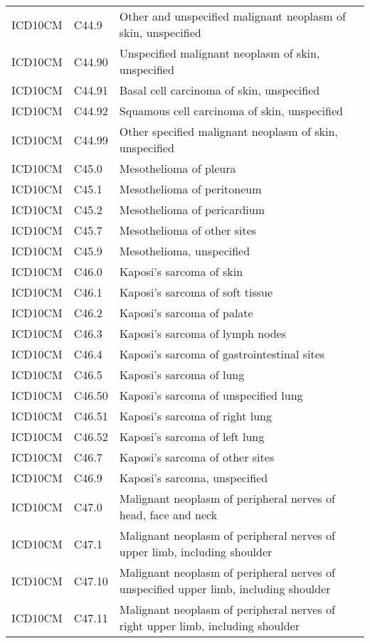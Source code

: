 \begin{longtable}{p{}p{}p{}}
  ICD10CM & C44.9 & Other and unspecified malignant neoplasm of skin, unspecified \\ 
  ICD10CM & C44.90 & Unspecified malignant neoplasm of skin, unspecified \\ 
  ICD10CM & C44.91 & Basal cell carcinoma of skin, unspecified \\ 
  ICD10CM & C44.92 & Squamous cell carcinoma of skin, unspecified \\ 
  ICD10CM & C44.99 & Other specified malignant neoplasm of skin, unspecified \\ 
  ICD10CM & C45.0 & Mesothelioma of pleura \\ 
  ICD10CM & C45.1 & Mesothelioma of peritoneum \\ 
  ICD10CM & C45.2 & Mesothelioma of pericardium \\ 
  ICD10CM & C45.7 & Mesothelioma of other sites \\ 
  ICD10CM & C45.9 & Mesothelioma, unspecified \\ 
  ICD10CM & C46.0 & Kaposi's sarcoma of skin \\ 
  ICD10CM & C46.1 & Kaposi's sarcoma of soft tissue \\ 
  ICD10CM & C46.2 & Kaposi's sarcoma of palate \\ 
  ICD10CM & C46.3 & Kaposi's sarcoma of lymph nodes \\ 
  ICD10CM & C46.4 & Kaposi's sarcoma of gastrointestinal sites \\ 
  ICD10CM & C46.5 & Kaposi's sarcoma of lung \\ 
  ICD10CM & C46.50 & Kaposi's sarcoma of unspecified lung \\ 
  ICD10CM & C46.51 & Kaposi's sarcoma of right lung \\ 
  ICD10CM & C46.52 & Kaposi's sarcoma of left lung \\ 
  ICD10CM & C46.7 & Kaposi's sarcoma of other sites \\ 
  ICD10CM & C46.9 & Kaposi's sarcoma, unspecified \\ 
  ICD10CM & C47.0 & Malignant neoplasm of peripheral nerves of head, face and neck \\ 
  ICD10CM & C47.1 & Malignant neoplasm of peripheral nerves of upper limb, including shoulder \\ 
  ICD10CM & C47.10 & Malignant neoplasm of peripheral nerves of unspecified upper limb, including shoulder \\ 
  ICD10CM & C47.11 & Malignant neoplasm of peripheral nerves of right upper limb, including shoulder \\ 

\end{longtable}
